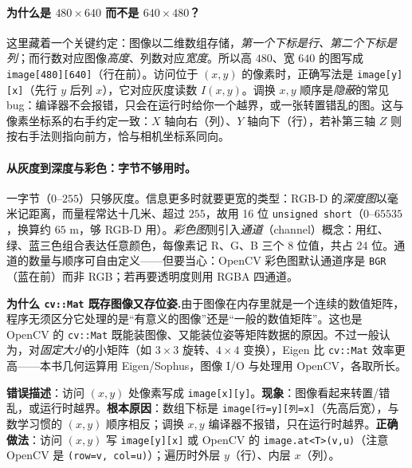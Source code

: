 \paragraph{为什么是 $480\times640$ 而不是 $640\times480$？}
这里藏着一个关键约定\cite{gaoxiang2019slam14}：图像以二维数组存储，\emph{第一个下标是行、第二个下标是列}；而行数对应图像\emph{高度}、列数对应\emph{宽度}。所以高 $480$、宽 $640$ 的图写成 \texttt{image[480][640]}（行在前）。访问位于 $(x,y)$ 的像素时，正确写法是 \texttt{image[y][x]}（先行 $y$ 后列 $x$），它对应灰度读数 $I(x,y)$。调换 $x,y$ 顺序是\emph{隐蔽}的常见 bug：编译器不会报错，只会在运行时给你一个越界，或一张转置错乱的图\cite{gaoxiang2019slam14}。这与像素坐标系的右手约定一致：$X$ 轴向右（列）、$Y$ 轴向下（行），若补第三轴 $Z$ 则按右手法则指向前方，恰与相机坐标系同向。

\paragraph{从灰度到深度与彩色：字节不够用时。}
一字节（$0\text{–}255$）只够灰度。信息更多时就要更宽的类型\cite{gaoxiang2019slam14}：RGB-D 的\emph{深度图}以毫米记距离，而量程常达十几米、超过 $255$，故用 16 位 \texttt{unsigned short}（$0\text{–}65535$，换算约 $65$ m，够 RGB-D 用）。\emph{彩色图}则引入\emph{通道}（channel）概念：用红、绿、蓝三色组合表达任意颜色，每像素记 R、G、B 三个 8 位值，共占 24 位。通道的数量与顺序可自由定义——但要当心：OpenCV 彩色图默认通道序是 \texttt{BGR}（蓝在前）而非 RGB；若再要透明度则用 RGBA 四通道。

\begin{note}
\textbf{为什么 \texttt{cv::Mat} 既存图像又存位姿.}\;由于图像在内存里就是一个连续的数值矩阵，程序无须区分它处理的是“有意义的图像”还是“一般的数值矩阵”\cite{gaoxiang2019slam14}。这也是 OpenCV 的 \texttt{cv::Mat} 既能装图像、又能装位姿等矩阵数据的原因。不过一般认为，对\emph{固定大小}的小矩阵（如 $3\times3$ 旋转、$4\times4$ 变换），Eigen 比 \texttt{cv::Mat} 效率更高——本书几何运算用 Eigen/Sophus，图像 I/O 与处理用 OpenCV，各取所长。
\end{note}

\begin{pitfall}
\textbf{错误描述}：访问 $(x,y)$ 处像素写成 \texttt{image[x][y]}。\textbf{现象}：图像看起来转置/错乱，或运行时越界。\textbf{根本原因}：数组下标是 \texttt{image[行=y][列=x]}（先高后宽），与数学习惯的 $(x,y)$ 顺序相反；调换 $x,y$ 编译器不报错，只在运行时越界\cite{gaoxiang2019slam14}。\textbf{正确做法}：访问 $(x,y)$ 写 \texttt{image[y][x]} 或 OpenCV 的 \texttt{image.\allowbreak at<T>(v,u)}（注意 OpenCV 是 \texttt{(row=v, col=u)}）；遍历时外层 $y$（行）、内层 $x$（列）。
\end{pitfall}

